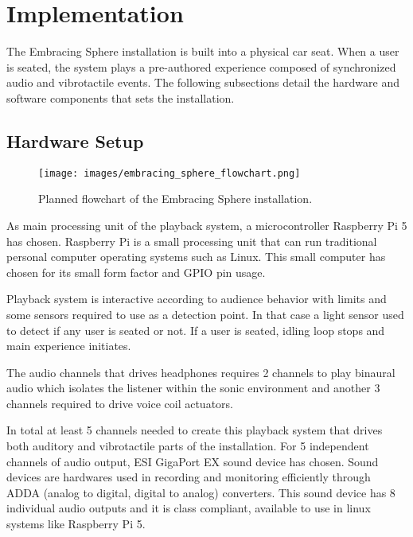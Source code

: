 \chapter{Implementation}
    The Embracing Sphere installation is built into a physical car seat. When a user is seated, the system plays a pre-authored experience composed of synchronized audio and vibrotactile events. The following subsections detail the hardware and software components that sets the installation.\par
    \section{Hardware Setup}
        \begin{figure}[H]
            \centering
            \texttt{[image: images/embracing\_sphere\_flowchart.png]}
            \caption{Planned flowchart of the Embracing Sphere installation.}
            \label{fig:ES_FLOW}
        \end{figure}

        As main processing unit of the playback system, a microcontroller Raspberry Pi 5 has chosen. Raspberry Pi is a small processing unit that can run traditional personal computer operating systems such as Linux. This small computer has chosen for its small form factor and GPIO pin usage.\par

        Playback system is interactive according to audience behavior with limits and some sensors required to use as a detection point. In that case a light sensor used to detect if any user is seated or not. If a user is seated, idling loop stops and main experience initiates.\par

        The audio channels that drives headphones requires 2 channels to play binaural audio which isolates the listener within the sonic environment and another 3 channels required to drive voice coil actuators.\par

        In total at least 5 channels needed to create this playback system that drives both auditory and vibrotactile parts of the installation. For 5 independent channels of audio output, ESI GigaPort EX sound device has chosen. Sound devices are hardwares used in recording and monitoring efficiently through ADDA (analog to digital, digital to analog) converters\cite{Sound_Reinforcement}. This sound device has 8 individual audio outputs and it is class compliant, available to use in linux systems like Raspberry Pi 5.\par

